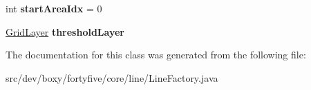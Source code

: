 \begin{DoxyCompactItemize}
\item 
\hypertarget{classdev_1_1boxy_1_1fortyfive_1_1core_1_1line_1_1_line_factory_a3840147439e4dbd3c45b88aae4d9be3c}{
int {\bfseries startAreaIdx} = 0}
\label{d0/db4/classdev_1_1boxy_1_1fortyfive_1_1core_1_1line_1_1_line_factory_a3840147439e4dbd3c45b88aae4d9be3c}

\item 
\hypertarget{classdev_1_1boxy_1_1fortyfive_1_1core_1_1line_1_1_line_factory_a8ce94cd3e57255c41fea88ac87a5688a}{
\hyperlink{classdev_1_1boxy_1_1fortyfive_1_1_grid_layer}{GridLayer} {\bfseries thresholdLayer}}
\label{d0/db4/classdev_1_1boxy_1_1fortyfive_1_1core_1_1line_1_1_line_factory_a8ce94cd3e57255c41fea88ac87a5688a}

\end{DoxyCompactItemize}


The documentation for this class was generated from the following file:\begin{DoxyCompactItemize}
\item 
src/dev/boxy/fortyfive/core/line/LineFactory.java\end{DoxyCompactItemize}
